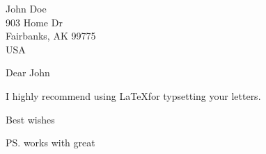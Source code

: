 \documentclass[english]{UAFletter}
\begin{document}
\begin{letter}
  {John Doe \\
    903 Home Dr \\
    Fairbanks, AK 99775 \\
    USA  \\
  }
  
  \opening{Dear John}
  
  I highly recommend using \LaTeX for typsetting your letters. 

  \closing{Best wishes}
  
  
  \ps{works with great}
  
\end{letter}
\end{document}
